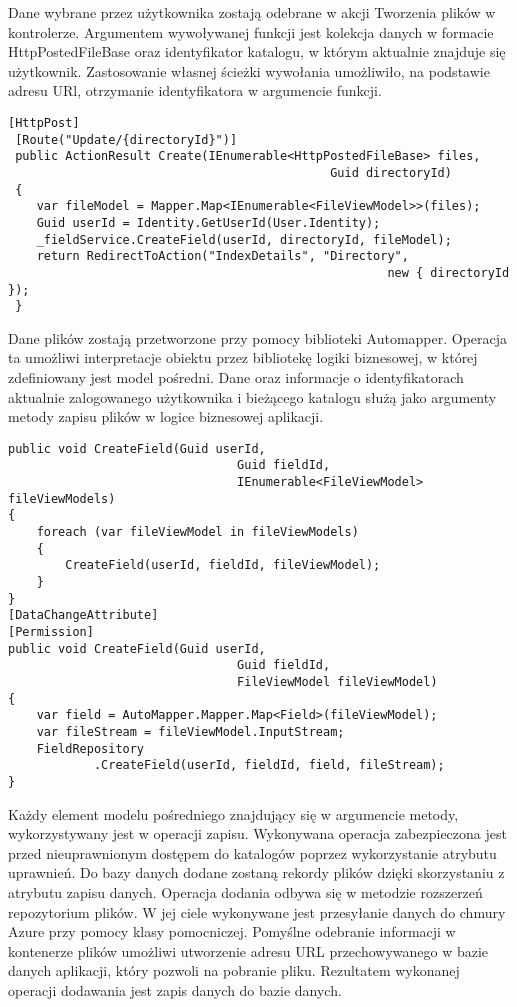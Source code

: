 \begin{itemize}
 Dane wybrane przez użytkownika zostają odebrane w akcji Tworzenia plików w kontrolerze. Argumentem wywoływanej funkcji jest kolekcja danych w formacie HttpPostedFileBase oraz identyfikator katalogu, w którym aktualnie znajduje się użytkownik. Zastosowanie własnej ścieżki wywołania umożliwiło, na podstawie adresu URl, otrzymanie identyfikatora w argumencie funkcji. 
 \newpage
 \begin{lstlisting}[caption=Akcja otrzymująca plik użytkownika]
 [HttpPost]
 [Route("Update/{directoryId}")]
 public ActionResult Create(IEnumerable<HttpPostedFileBase> files,
 											 Guid directoryId)
 {
 	var fileModel = Mapper.Map<IEnumerable<FileViewModel>>(files);
 	Guid userId = Identity.GetUserId(User.Identity);
 	_fieldService.CreateField(userId, directoryId, fileModel);
 	return RedirectToAction("IndexDetails", "Directory",
 													 new { directoryId });
 }
\end{lstlisting}
Dane plików zostają przetworzone przy pomocy biblioteki Automapper. Operacja ta umożliwi interpretacje obiektu przez bibliotekę logiki biznesowej, w której zdefiniowany jest model pośredni. Dane oraz informacje o identyfikatorach aktualnie zalogowanego użytkownika i bieżącego katalogu służą jako argumenty metody zapisu plików w logice biznesowej aplikacji.
\\
\begin{lstlisting}[caption=Przetwarzanie pliku w bibliotece logiki biznesowej]
public void CreateField(Guid userId,
								Guid fieldId,
								IEnumerable<FileViewModel> fileViewModels)
{
	foreach (var fileViewModel in fileViewModels)
	{
		CreateField(userId, fieldId, fileViewModel);
	}
}
[DataChangeAttribute]
[Permission]
public void CreateField(Guid userId, 
								Guid fieldId,
								FileViewModel fileViewModel)
{
	var field = AutoMapper.Mapper.Map<Field>(fileViewModel);
	var fileStream = fileViewModel.InputStream;
	FieldRepository
			.CreateField(userId, fieldId, field, fileStream);
}

\end{lstlisting}
\newpage
Każdy element modelu pośredniego znajdujący się w argumencie metody, wykorzystywany jest w operacji zapisu. Wykonywana operacja zabezpieczona jest przed  nieuprawnionym dostępem do katalogów poprzez wykorzystanie atrybutu uprawnień. Do bazy danych dodane zostaną rekordy plików dzięki skorzystaniu z atrybutu zapisu danych. Operacja dodania odbywa się w metodzie rozszerzeń repozytorium plików. W jej ciele wykonywane jest przesyłanie danych do chmury Azure przy pomocy klasy pomocniczej. Pomyślne odebranie informacji w kontenerze plików umożliwi utworzenie adresu URL przechowywanego w bazie danych aplikacji, który pozwoli na pobranie pliku. Rezultatem wykonanej operacji dodawania jest zapis danych do bazie danych.


\end{itemize}
